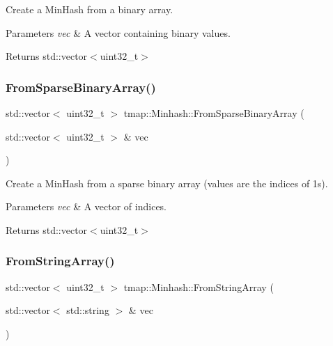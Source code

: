 Create a Min\+Hash from a binary array. 


\begin{DoxyParams}{Parameters}
{\em vec} & A vector containing binary values. \\
\hline
\end{DoxyParams}
\begin{DoxyReturn}{Returns}
std\+::vector$<$uint32\+\_\+t$>$ 
\end{DoxyReturn}
\mbox{\label{classtmap_1_1Minhash_aec48525d1c8006f573b0c534e53d894a}} 
\subsubsection{\texorpdfstring{From\+Sparse\+Binary\+Array()}{FromSparseBinaryArray()}}
{\footnotesize\ttfamily std\+::vector$<$ uint32\+\_\+t $>$ tmap\+::\+Minhash\+::\+From\+Sparse\+Binary\+Array (\begin{DoxyParamCaption}\item[{std\+::vector$<$ uint32\+\_\+t $>$ \&}]{vec }\end{DoxyParamCaption})}



Create a Min\+Hash from a sparse binary array (values are the indices of 1s). 


\begin{DoxyParams}{Parameters}
{\em vec} & A vector of indices. \\
\hline
\end{DoxyParams}
\begin{DoxyReturn}{Returns}
std\+::vector$<$uint32\+\_\+t$>$ 
\end{DoxyReturn}
\mbox{\label{classtmap_1_1Minhash_ab21e92280c7265a8df9477734361b8fc}} 
\subsubsection{\texorpdfstring{From\+String\+Array()}{FromStringArray()}}
{\footnotesize\ttfamily std\+::vector$<$ uint32\+\_\+t $>$ tmap\+::\+Minhash\+::\+From\+String\+Array (\begin{DoxyParamCaption}\item[{std\+::vector$<$ std\+::string $>$ \&}]{vec }\end{DoxyParamCaption})}



